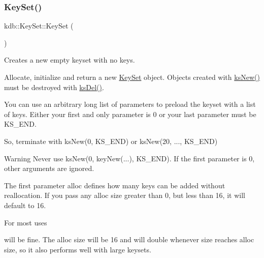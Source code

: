 \subsubsection{\texorpdfstring{KeySet()}{KeySet()}\hspace{0.1cm}{\footnotesize\ttfamily [1/5]}}
{\footnotesize\ttfamily kdb\+::\+Key\+Set\+::\+Key\+Set (\begin{DoxyParamCaption}{ }\end{DoxyParamCaption})\hspace{0.3cm}{\ttfamily [inline]}}



Creates a new empty keyset with no keys. 

Allocate, initialize and return a new \mbox{\hyperlink{classkdb_1_1KeySet}{Key\+Set}} object. Objects created with \mbox{\hyperlink{group__keyset_ga671e1aaee3ae9dc13b4834a4ddbd2c3c}{ks\+New()}} must be destroyed with \mbox{\hyperlink{group__keyset_ga27e5c16473b02a422238c8d970db7ac8}{ks\+Del()}}.

You can use an arbitrary long list of parameters to preload the keyset with a list of keys. Either your first and only parameter is 0 or your last parameter must be K\+S\+\_\+\+E\+ND.

So, terminate with ks\+New(0, K\+S\+\_\+\+E\+N\+D) or ks\+New(20, ..., K\+S\+\_\+\+E\+N\+D)

\begin{DoxyWarning}{Warning}
Never use ks\+New(0, key\+New(...), K\+S\+\_\+\+E\+N\+D). If the first parameter is 0, other arguments are ignored.
\end{DoxyWarning}
The first parameter {\ttfamily alloc} defines how many keys can be added without reallocation. If you pass any alloc size greater than 0, but less than 16, it will default to 16.

For most uses


\begin{DoxyCodeInclude}{0}
\DoxyCodeLine{\textcolor{comment}{// enough memory for up to 16 keys, without needing reallocation}}
\end{DoxyCodeInclude}
 will be fine. The alloc size will be 16 and will double whenever size reaches alloc size, so it also performs well with large keysets.

